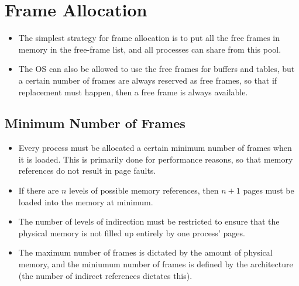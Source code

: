 \documentclass{article}
\theoremstyle{plain}
\theoremstyle{definition}
\begin{document}
\section{Frame Allocation}
\begin{itemize}
    \item The simplest strategy for frame allocation is to put all the free frames in memory in the free-frame list, and all processes can share from this pool.
    
    \item The OS can also be allowed to use the free frames for buffers and tables, but a certain number of frames are always reserved as free frames, so that if replacement must happen, then a free frame is always available. 
\end{itemize}

\subsection{Minimum Number of Frames}
\begin{itemize}
    \item Every process must be allocated a certain minimum number of frames when it is loaded. This is primarily done for performance reasons, so that memory references do not result in page faults.
    
    \item If there are $n$ levels of possible memory references, then $n+1$ pages must be loaded into the memory at minimum. 
    
    \item The number of levels of indirection must be restricted to ensure that the physical memory is not filled up entirely by one process' pages. 
    
    \item The maximum number of frames is dictated by the amount of physical memory, and the miniumum number of frames is defined by the architecture (the number of indirect references dictates this). 
\end{itemize}
\end{document}
